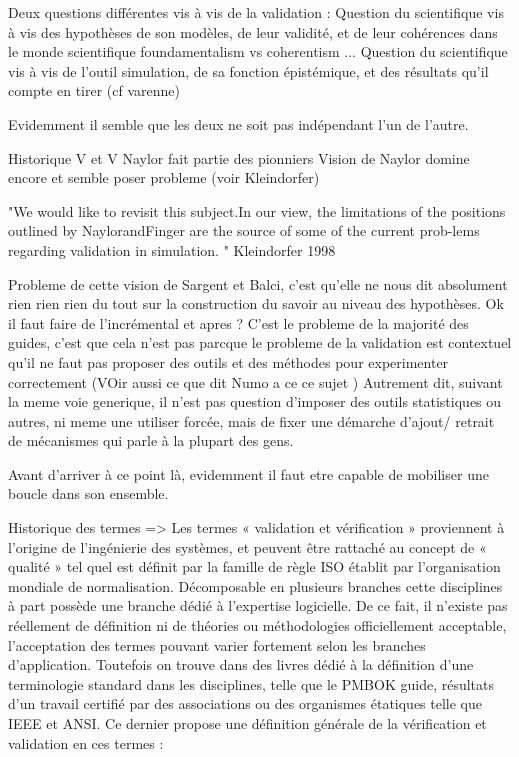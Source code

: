 
Deux questions différentes vis à vis de la validation : 
Question du scientifique vis à vis des hypothèses de son modèles, de leur validité, et de leur cohérences dans le monde scientifique  foundamentalism vs coherentism ... 
Question du scientifique vis à vis de l'outil simulation, de sa fonction épistémique, et des résultats qu'il compte en tirer (cf varenne)

Evidemment il semble que les deux ne soit pas indépendant l'un de l'autre.

Historique V et V
Naylor fait partie des pionniers
Vision de Naylor domine encore et semble poser probleme (voir Kleindorfer)

"We would like to revisit this subject.In our view, the limitations of the positions outlined by NaylorandFinger are the source of some of the current prob-lems regarding validation in simulation. " Kleindorfer 1998

Probleme de cette vision de Sargent et Balci, c'est qu'elle ne nous dit absolument rien rien rien du tout sur la construction du savoir au niveau des hypothèses. Ok il faut faire de l'incrémental et apres ? C'est le probleme de la majorité des guides, c'est que cela n'est pas parcque le probleme de la validation est contextuel qu'il ne faut pas proposer des outils et des méthodes pour experimenter correctement (VOir aussi ce que dit Numo a ce ce sujet )
Autrement dit, suivant la meme voie generique, il n'est pas question d'imposer des outils statistiques ou autres, ni meme une utiliser forcée, mais de fixer une démarche d'ajout/ retrait de mécanismes qui parle à la plupart des gens.

Avant d'arriver à ce point là, evidemment il faut etre capable de mobiliser une boucle dans son ensemble.


Historique des termes => Les termes « validation et vérification » proviennent à l'origine de l'ingénierie des systèmes, et peuvent être rattaché au concept de « qualité » tel quel est définit par la famille de règle ISO établit par l'organisation mondiale de normalisation. Décomposable en plusieurs branches cette disciplines à part possède une branche dédié à l'expertise logicielle. De ce fait, il n'existe pas réellement de définition ni de théories ou méthodologies officiellement acceptable, l'acceptation des termes pouvant varier fortement selon les branches d'application. Toutefois on trouve dans des livres dédié à la définition d'une terminologie standard dans les disciplines, telle que le {PMBOK guide}, résultats d'un travail certifié par des associations ou des organismes étatiques telle que IEEE et ANSI. Ce dernier propose une définition générale de la vérification et validation en ces termes : 


